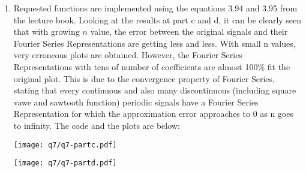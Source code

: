 \documentclass[10pt,a4paper, margin=1in]{article}
\begin{document}
\begin{enumerate}
\item %
    Requested functions are implemented using the equations 3.94 and 3.95 from the lecture book. Looking at the results at part c and d, it can be clearly seen that with growing $n$ value, the error between the original signals and their Fourier Series Representations are getting less and less. With small n values, very erroneous plots are obtained. However, the Fourier Series Representations with tens of number of coefficients are almost 100\% fit the original plot. This is due to the convergence property of Fourier Series, stating that every continuous and also many discontinuous (including square vawe and sawtooth function) periodic signals have a Fourier Series Representation for which the approximation error approaches to 0 as n goes to infinity. The code and the plots are below:


    \begin{center}
        
    \end{center}

    \begin{center}
        \texttt{[image: q7/q7-partc.pdf]}
    \end{center}
    \begin{center}
        \texttt{[image: q7/q7-partd.pdf]}
    \end{center}

\end{enumerate}
\end{document}
